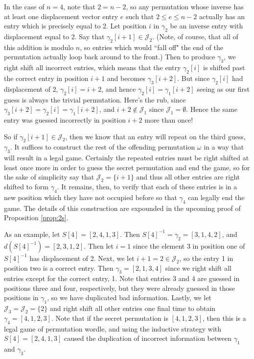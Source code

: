 \documentclass[article]{amsart}
\theoremstyle{plain}
\begin{document}
In the case of $n=4$, note that $2 = n-2$, so any permutation whose inverse has at least one displacement vector entry $e$ such that $2 \leq e \leq n-2$ actually has an entry which is precisely equal to 2. Let position $i$ in $\gamma_2$ be an inverse entry with displacement equal to 2. Say that $\gamma_2[i+1] \in \mathcal{J}_2$. (Note, of course, that all of this addition is modulo $n$, so entries which would ``fall off" the end of the permutation actually loop back around to the front.) Then to produce $\gamma_3$, we right shift all incorrect entries, which means that the entry $\gamma_2[i]$ is shifted past the correct entry in position $i+1$ and becomes $\gamma_3[i+2]$. But since $\gamma_2[i]$ had displacement of 2, $\gamma_2[i] = i+2$, and hence $\gamma_2[i] = \gamma_1[i+2]$ seeing as our first guess is always the trivial permutation. Here's the rub, since $\gamma_3[i+2] = \gamma_2[i] = \gamma_1[i+2]$, and $i+2 \notin \mathcal{J}_1$ since $\mathcal{J}_1 = \emptyset$. Hence the same entry was guessed incorrectly in position $i+2$ more than once!

So if $\gamma_2[i+1] \in \mathcal{J}_2$, then we know that an entry will repeat on the third guess, $\gamma_3$. It suffices to construct the rest of the offending permutation $\omega$ in a way that will result in a legal game. Certainly the repeated entries must be right shifted at least once more in order to guess the secret permutation and end the game, so for the sake of simplicity say that $\mathcal{J}_2 = \{i+1\}$ and thus all other entries are right shifted to form $\gamma_4$. It remains, then, to verify that each of these entries is in a new position which they have not occupied before so that $\gamma_4$ can legally end the game. The details of this construction are expounded in the upcoming proof of Proposition \ref{prop:2s}.

As an example, let $S[4] = [2,4,1,3]$. Then $S[4]^{-1} = \gamma_2 = [3,1,4,2]$, and $d(S[4]^{-1}) = [2,3,1,2]$. Then let $i = 1$ since the element 3 in position one of $S[4]^{-1}$ has displacement of 2. Next, we let $i+1 = 2 \in \mathcal{J}_2$, so the entry 1 in position two is a correct entry. Then $\gamma_3 = [2,1,3,4]$ since we right shift all entries except for the correct entry, 1. Note that entries 3 and 4 are guessed in positions three and four, respectively, but they were already guessed in those positions in $\gamma_1$, so we have duplicated bad information. Lastly, we let $\mathcal{J}_3 = \mathcal{J}_2 = \{2\}$ and right shift all other entries one final time to obtain $\gamma_4 = [4,1,2,3]$. Note that if the secret permutation is $[4,1,2,3]$, then this is a legal game of permutation wordle, and using the inductive strategy with $S[4] = [2,4,1,3]$ caused the duplication of incorrect information between $\gamma_1$ and $\gamma_3$.
\end{document}
